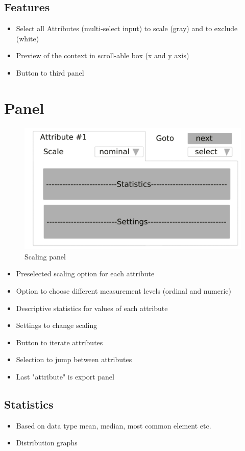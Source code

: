 \documentclass[]{article}
\begin{document}
\subsection{Features}
\begin{itemize}
	\item Select all Attributes (multi-select input) to scale (gray) and to exclude (white)
	\item Preview of the context in scroll-able box (x and y axis)
	\item Button to third panel
\end{itemize}

\newpage
\section{Panel}
\begin{figure}[H]
	\includegraphics[width=\linewidth]{panel-3.png}
	\caption{Scaling panel}
	\label{fig:p2}
\end{figure}
\begin{itemize}
	\item Preselected scaling option for each attribute
	\item Option to choose different measurement levels (ordinal and numeric)
	\item Descriptive statistics for values of each attribute
	\item Settings to change scaling
	\item Button to iterate attributes
	\item Selection to jump between attributes
	\item Last "attribute" is export panel
\end{itemize}

\subsection{Statistics}
\begin{itemize}
	\item Based on data type mean, median, most common element etc.
	\item Distribution graphs
\end{itemize}
\end{document}

